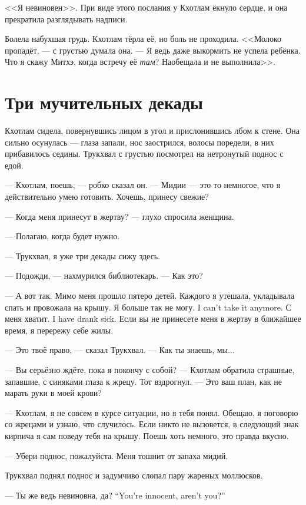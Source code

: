 <<Я невиновен>>.
При виде этого послания у Кхотлам ёкнуло сердце, и она прекратила разглядывать надписи.

Болела набухшая грудь.
Кхотлам тёрла её, но боль не проходила.
<<Молоко пропадёт, --- с грустью думала она.
--- Я ведь даже выкормить не успела ребёнка.
Что я скажу Митхэ, когда встречу её \emph{там}?
Наобещала и не выполнила>>.

\section{Три мучительных декады}

Кхотлам сидела, повернувшись лицом в угол и прислонившись лбом к стене.
Она сильно осунулась --- глаза запали, нос заострился, волосы поредели, в них прибавилось седины.
Трукхвал с грустью посмотрел на нетронутый поднос с едой.

--- Кхотлам, поешь, --- робко сказал он.
--- Мидии --- это то немногое, что я действительно умею готовить.
Хочешь, принесу свежие?

--- Когда меня принесут в жертву? --- глухо спросила женщина.

--- Полагаю, когда будет нужно.

--- Трукхвал, я уже три декады сижу здесь.

--- Подожди, --- нахмурился библиотекарь.
--- Как это?

--- А вот так.
Мимо меня прошло пятеро детей.
Каждого я утешала, укладывала спать и провожала на крышу.
{Я больше так не могу.}
{I can't take it anymore.}
{С меня хватит.}
{I have drank sick.}
Если вы не принесете меня в жертву в ближайшее время, я перережу себе жилы.

--- Это твоё право, --- сказал Трукхвал.
--- Как ты знаешь, мы...

--- Вы серьёзно ждёте, пока я покончу с собой? --- Кхотлам обратила страшные, запавшие, с синяками глаза к жрецу.
Тот вздрогнул.
--- Это ваш план, как не марать руки в моей крови?

--- Кхотлам, я не совсем в курсе ситуации, но я тебя понял.
Обещаю, я поговорю со жрецами и узнаю, что случилось.
Если никто не вызовется, в следующий знак кирпича я сам поведу тебя на крышу.
Поешь хоть немного, это правда вкусно.

--- Убери поднос, пожалуйста.
Меня тошнит от запаха мидий.

Трукхвал поднял поднос и задумчиво слопал пару жареных моллюсков.

{--- Ты же ведь невиновна, да?}
{``You're innocent, aren't you?''}


